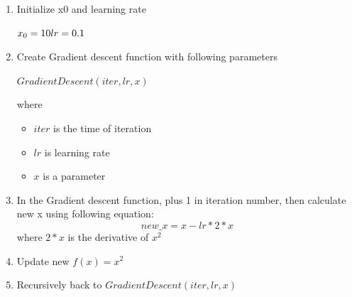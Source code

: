 \documentclass[12pt]{article}
\begin{document}
\begin{enumerate}
    \item Initialize x0 and learning rate
    
    \(    x_0 = 10  \\
    lr = 0.1\)

    \item Create Gradient descent function with following parameters
    
    {\centering \(GradientDescent(iter, lr, x)\)}

    where 
    \begin{itemize}
        \item \(iter\) is the time of iteration
        \item \(lr\) is learning rate
        \item \(x\) is a parameter
    \end{itemize}

    \item In the Gradient descent function, plus 1 in iteration number, then calculate new x using following equation:
    \begin{equation}
        new\_x = x - lr * 2 * x
    \end{equation}
    where \(2*x\) is the derivative of \(x^2\)

    \item Update new \(f(x) = x^2\)

    \item Recursively back to \(GradientDescent(iter, lr, x)\)
\end{enumerate}
\end{document}
